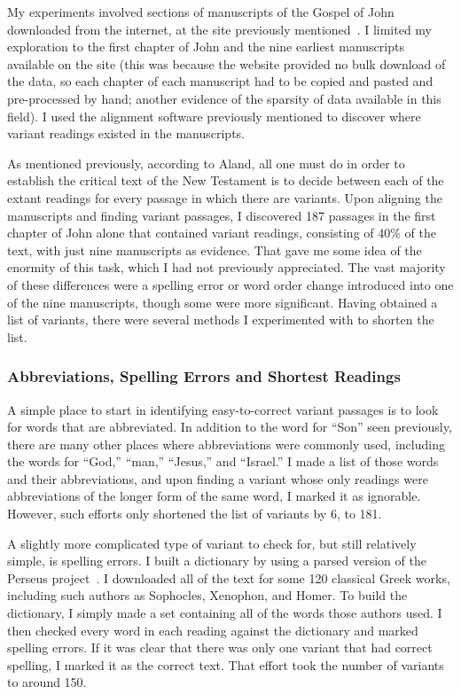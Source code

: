 \documentclass[onecolumn, 12pt]{article}
\begin{document}
My experiments involved sections of manuscripts of the Gospel of John
downloaded from the internet, at the site previously
mentioned~\cite{igntp-gospel-of-john-online}.  I limited my exploration to the
first chapter of John and the nine earliest manuscripts available on the site
(this was because the website provided no bulk download of the data, so each
chapter of each manuscript had to be copied and pasted and pre-processed by
hand; another evidence of the sparsity of data available in this field).  I
used the alignment software previously mentioned to discover where variant
readings existed in the manuscripts.

As mentioned previously, according to Aland, all one must do in order to
establish the critical text of the New Testament is to decide between each of
the extant readings for every passage in which there are variants.  Upon
aligning the manuscripts and finding variant passages, I discovered 187
passages in the first chapter of John alone that contained variant readings,
consisting of 40\% of the text, with just nine manuscripts as evidence.  That
gave me some idea of the enormity of this task, which I had not previously
appreciated.  The vast majority of these differences were a spelling error or
word order change introduced into one of the nine manuscripts, though some were
more significant.  Having obtained a list of variants, there were several
methods I experimented with to shorten the list.

\subsubsection{Abbreviations, Spelling Errors and Shortest Readings}

A simple place to start in identifying easy-to-correct variant passages is to
look for words that are abbreviated.  In addition to the word for ``Son'' seen
previously, there are many other places where abbreviations were commonly used,
including the words for ``God,'' ``man,'' ``Jesus,'' and ``Israel.''  I made a
list of those words and their abbreviations, and upon finding a variant whose
only readings were abbreviations of the longer form of the same word, I marked
it as ignorable.  However, such efforts only shortened the list of variants by
6, to 181.

A slightly more complicated type of variant to check for, but still relatively
simple, is spelling errors.  I built a dictionary by using a parsed version of
the Perseus project~\cite{perseus-project}.  I downloaded all of the text for
some 120 classical Greek works, including such authors as Sophocles, Xenophon,
and Homer.  To build the dictionary, I simply made a set containing all of the
words those authors used.  I then checked every word in each reading against
the dictionary and marked spelling errors.  If it was clear that there was only
one variant that had correct spelling, I marked it as the correct text.  That
effort took the number of variants to around 150.
\end{document}
